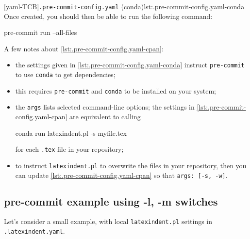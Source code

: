 		[yaml-TCB]{\texttt{.pre-commit-config.yaml} (conda)}{lst:.pre-commit-config.yaml-conda}
		Once created, you should then be able to run the following command:
		\begin{commandshell}
pre-commit run --all-files  
\end{commandshell}
		A few notes about \cref{lst:.pre-commit-config.yaml-cpan}:
		\begin{itemize}
			\item the settings given in \cref{lst:.pre-commit-config.yaml-conda} instruct
			      \texttt{pre-commit} to use \texttt{conda} to get dependencies;
			\item this requires \texttt{pre-commit} and \texttt{conda} to be installed on your system;
			\item the \texttt{args} lists selected command-line options; the settings in
			      \cref{lst:.pre-commit-config.yaml-cpan} are equivalent to calling
			      \begin{commandshell}
conda run latexindent.pl -s myfile.tex       
\end{commandshell}
			      for each \texttt{.tex} file in your repository;
			\item to instruct \texttt{latexindent.pl} to overwrite the files in your repository, then you
			      can update \cref{lst:.pre-commit-config.yaml-cpan} so that \texttt{args: [-s, -w]}.
		\end{itemize}

	\subsection{pre-commit example using -l, -m switches}
		Let's consider a small example, with local \texttt{latexindent.pl} settings in
		\texttt{.latexindent.yaml}.


